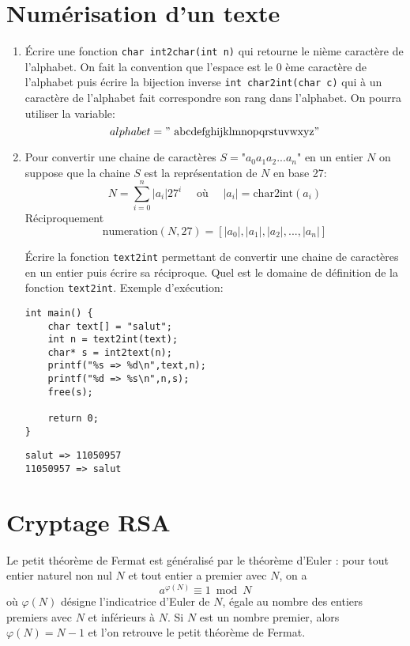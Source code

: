 \documentclass{article}
\begin{document}
\section*{Numérisation d'un texte}
\begin{enumerate}
\item Écrire une fonction {\tt char int2char(int n)} qui retourne le nième caractère de l'alphabet. On fait la convention que l'espace est le 0 ème caractère de l'alphabet puis écrire la bijection inverse {\tt int char2int(char c)} qui à un caractère de l'alphabet fait correspondre son rang dans l'alphabet. On pourra utiliser la variable: 
\[alphabet="\mbox{ abcdefghijklmnopqrstuvwxyz}"\]
\item Pour convertir une chaine  de caractères $S=\mbox{"}a_0a_1a_2...a_n\mbox{"}$ en un entier $N$ on suppose que la chaine $S$ est la représentation de $N$ en base 27:
\[N=\sum_{i=0}^n|a_i|27^i\quad \mbox{ où }\quad |a_i|=\mbox{char2int}(a_i)\]
Réciproquement
\[\mbox{numeration}(N,27)=[|a_0|,|a_1|,|a_2|,...,|a_n|]\]

Écrire la fonction  {\tt text2int} permettant de convertir une chaine de caractères en un entier puis écrire sa réciproque. 
Quel est le domaine de définition de la fonction {\tt text2int}. Exemple d'exécution:
\begin{verbatim}
int main() {
    char text[] = "salut";
    int n = text2int(text);
    char* s = int2text(n);
    printf("%s => %d\n",text,n);
    printf("%d => %s\n",n,s);
    free(s);
    
    return 0;
}    
\end{verbatim}
\begin{verbatim}
salut => 11050957
11050957 => salut
\end{verbatim}
\end{enumerate}
\section*{Cryptage RSA}
Le petit théorème de Fermat est généralisé par le théorème d'Euler : pour tout entier naturel non nul $N$ et tout entier a premier avec $N$, on a
 \[{\displaystyle a^{\varphi (N)}\equiv 1{\bmod {N}}}\]
 où $\varphi(N)$ désigne l'indicatrice d'Euler de $N$, égale au nombre des entiers premiers avec $N$ et inférieurs à $N$. Si $N$ est un nombre premier, alors $\varphi(N)=N-1$ et l'on retrouve le petit théorème de Fermat.
 
\end{document}
